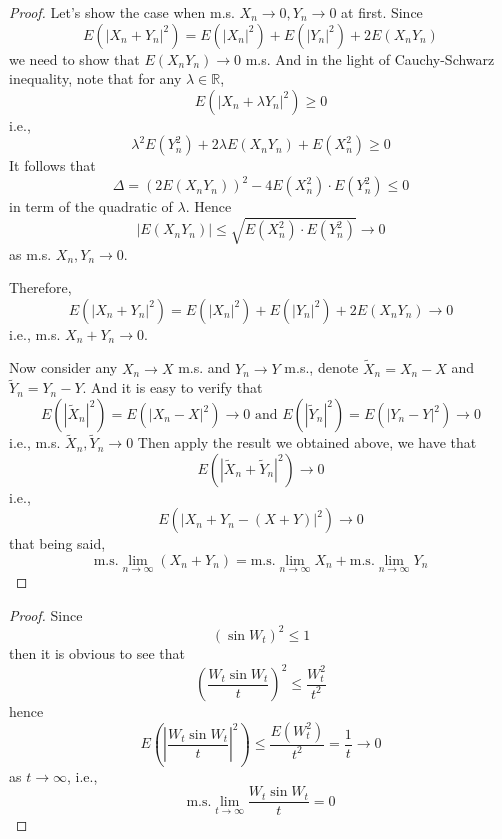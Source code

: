 \documentclass{homework}
\begin{document}
    \problem
    \begin{proof}
        Let's show the case when m.s. $X_n\to 0,Y_n\to 0$ at first.
        Since
        \[E(|X_n+Y_n|^2)=E(|X_n|^2)+E(|Y_n|^2)+2E(X_nY_n)\]
        we need to show that $E(X_nY_n)\to 0$ m.s.
        And in the light of Cauchy-Schwarz inequality, note that
        for any $\lambda\in\mathbb R$,
        \[E(|X_n+\lambda Y_n|^2)\geq 0\]
        i.e.,
        \[\lambda^2E(Y_n^2)+2\lambda E(X_nY_n)+E(X_n^2)\geq 0\]
        It follows that
        \[\Delta=(2E(X_nY_n))^2-4E(X_n^2)\cdot E(Y_n^2)\leq 0\]
        in term of the quadratic of $\lambda$. Hence
        \[|E(X_nY_n)|\leq\sqrt{E(X_n^2)\cdot E(Y_n^2)}\to 0\]
        as m.s. $X_n,Y_n\to 0$.

        Therefore,
        \[E(|X_n+Y_n|^2)=E(|X_n|^2)+E(|Y_n|^2)+2E(X_nY_n)\to 0\]
        i.e., m.s. $X_n+Y_n\to 0$.

        Now consider any $X_n\to X$ m.s. and $Y_n\to Y$ m.s.,
        denote $\tilde X_n=X_n-X$ and $\tilde Y_n=Y_n-Y$.
        And it is easy to verify that
        \[E(|\tilde X_n|^2)=E(|X_n-X|^2)\to 0
        \text{ and }
        E(|\tilde Y_n|^2)=E(|Y_n-Y|^2)\to 0 \]
        i.e., m.s. $\tilde X_n,\tilde Y_n\to 0$
        Then apply the result we obtained above, we have that
        \[E(|\tilde X_n+\tilde Y_n|^2)\to 0\]
        i.e.,
        \[E(|X_n+Y_n-(X+Y)|^2)\to 0\]
        that being said,
        \[\text{m.s.}\lim_{n\to\infty}(X_n+Y_n)
        =\text{m.s.}\lim_{n\to\infty}X_n
        +\text{m.s.}\lim_{n\to\infty}Y_n\]
    \end{proof}

    \problem
    \begin{subproblem}
        \item

        \item
        \begin{proof}
            Since
            \[(\sin W_t)^2\leq 1\]
            then it is obvious to see that
            \[\left(\frac{W_t\sin W_t}{t}\right)^2\leq\frac{W_t^2}{t^2}\]
            hence
            \[E\left(\left|\frac{W_t\sin W_t}{t}\right|^2\right)
            \leq\frac{E(W_t^2)}{t^2}=\frac{1}{t}\to 0\]
            as $t\to\infty$, i.e.,
            \[\text{m.s.}\lim_{t\to\infty}\frac{W_t\sin W_t}{t}=0\]
        \end{proof}
    \end{subproblem}
\end{document}
